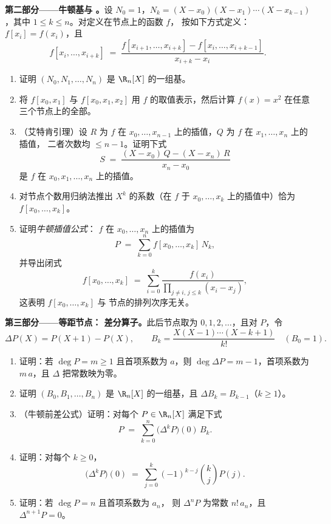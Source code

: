 \begin{problem}
\medskip
\noindent\textbf{第二部分——牛顿基与
。}设 $N_0 = 1$，$N_k = (X - x_0)(X - x_1) \cdots
(X - x_{k-1})$，其中 $1 \leq k \leq n$。对定义在节点上的函数 $f$，
按如下方式定义\emph{}：
$f[x_i] = f(x_i)$，且
\[
f[x_i, \dots, x_{i+k}] \;=\;
\frac{f[x_{i+1}, \dots, x_{i+k}] - f[x_i, \dots, x_{i+k-1}]}
{x_{i+k} - x_i} .
\]
\begin{enumerate}[resume]
  \item 证明 $(N_0, N_1, \dots, N_n)$ 是
        $\R_n[X]$ 的一组基。
  \item 将 $f[x_0, x_1]$ 与 $f[x_0, x_1, x_2]$ 用
        $f$ 的取值表示，然后计算
        $f(x) = x^2$ 在任意三个节点上的全部。
  \item （艾特肯引理）设 $R$ 为 $f$ 在 $x_0, \dots,
        x_{n-1}$ 上的插值，$Q$ 为 $f$ 在 $x_1, \dots, x_n$ 上的插值，
        二者次数均 $\leq n - 1$。证明下式
        \[
        S \;=\; \frac{(X - x_0)\,Q - (X - x_n)\,R}{x_n - x_0}
        \]
        是 $f$ 在 $x_0, x_1, \dots, x_n$ 上的插值。
  \item 对节点个数用归纳法推出
        $X^{k}$ 的系数（在 $f$ 于 $x_0,
        \dots, x_k$ 上的插值中）恰为 $f[x_0, \dots, x_k]$。
  \item 证明\emph{牛顿插值公式}：
        $f$ 在 $x_0, \dots, x_n$ 上的插值为
        \[
        P \;=\; \sum_{k=0}^{n} f[x_0, \dots, x_k]\, N_k ,
        \]
        并导出闭式
        \[
        f[x_0, \dots, x_k] \;=\; \sum_{i=0}^{k}
        \frac{f(x_i)}{\prod_{j \neq i,\, j \leq k} (x_i - x_j)} ,
        \]
        这表明 $f[x_0, \dots, x_k]$ 与
        节点的排列次序无关。
\end{enumerate}

\medskip
\noindent\textbf{第三部分——等距节点：
差分算子。}此后节点取为 $0, 1, 2, \dots$，且对
 $P$，令
\[
\Delta P(X) = P(X + 1) - P(X),
\qquad
B_k = \frac{X(X-1)\cdots(X-k+1)}{k!} \quad (B_0 = 1).
\]
\begin{enumerate}[resume]
  \item 证明：若 $\deg P = m \geq 1$ 且首项系数为
        $a$，则 $\deg \Delta P = m - 1$，首项系数为
        $m\,a$，且 $\Delta$ 把常数映为零。
  \item 证明 $(B_0, B_1, \dots, B_n)$ 是
        $\R_n[X]$ 的一组基，且 $\Delta B_k = B_{k-1}$（$k \geq 1$）。
  \item （牛顿前差公式）证明：对每个 $P
        \in \R_n[X]$ 满足下式
        \[
        P \;=\; \sum_{k=0}^{n} \bigl(\Delta^{k} P\bigr)(0)\, B_k .
        \]
  \item 证明：对每个 $k \geq 0$，
        \[
        \bigl(\Delta^{k} P\bigr)(0) \;=\;
        \sum_{j=0}^{k} (-1)^{k-j} \binom{k}{j} P(j) .
        \]
  \item 证明：若 $\deg P = n$ 且首项系数为 $a_n$，
        则 $\Delta^{n} P$ 为常数 $n!\,a_n$，且
        $\Delta^{n+1} P = 0$。
\end{enumerate}


\end{problem}
